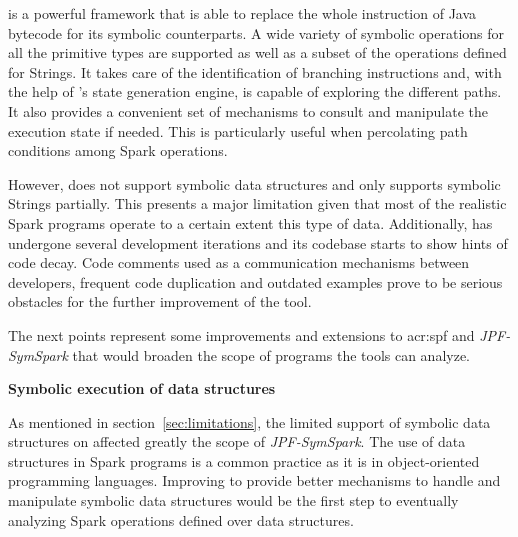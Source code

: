 \begin{enumerate}
	\spf{} is a powerful framework that is able to replace the whole instruction of Java bytecode for its symbolic counterparts. A wide variety of symbolic operations for all the primitive types are supported as well as a subset of the operations defined for Strings. It takes care of the identification of branching instructions and, with the help of \jpf{}'s state generation engine, is capable of exploring the different paths. It also provides a convenient set of mechanisms to consult and manipulate the execution state if needed. This is particularly useful when percolating path conditions among Spark operations. 
	
	However, \spf{} does not support symbolic data structures and only supports symbolic Strings partially. This presents a major limitation given that most of the realistic Spark programs operate to a certain extent this type of data. Additionally, \spf{} has undergone several development iterations and its codebase starts to show hints of code decay. Code comments used as a communication mechanisms between developers, frequent code duplication and outdated examples prove to be serious obstacles for the further improvement of the tool.
	
\end{enumerate}

\label{sec:future}


The next points represent some improvements and extensions to \acrlong{acr:spf} and \textit{JPF-SymSpark} that would broaden the scope of programs the tools can analyze.

\textbf{Symbolic execution of data structures}

As mentioned in section~\ref{sec:limitations}, the limited support of symbolic data structures on \spf{} affected greatly the scope of \textit{JPF-SymSpark}. The use of data structures in Spark programs is a common practice as it is in object-oriented programming languages. Improving \spf{} to provide better mechanisms to handle and manipulate symbolic data structures would be the first step to eventually analyzing Spark operations defined over data structures.


